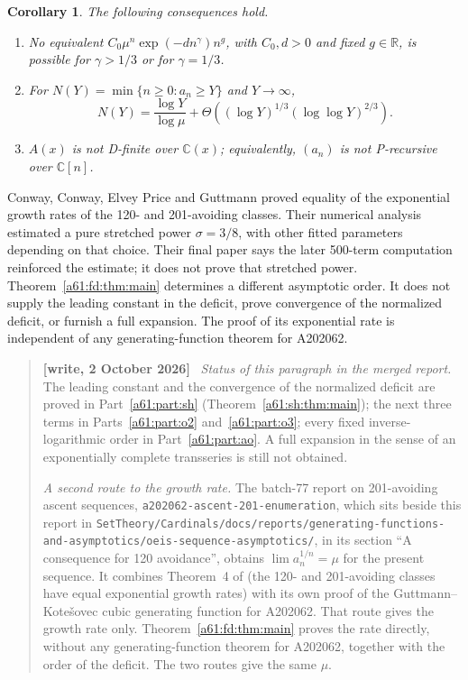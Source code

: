\documentclass[11pt,letterpaper]{article}
\numberwithin{equation}{section}
\newtheorem{corollary}[theorem]{Corollary}
\theoremstyle{remark}\newtheorem{remark}[theorem]{Remark}
\newcommand{\C}{\mathbb C}
\newenvironment{writenote}{\par\smallskip\begin{quote}\small\textbf{[write, 2 October 2026]}\ }{\end{quote}\smallskip}
\newcommand{\repopath}[1]{\nolinkurl{#1}}
\begin{document}
\begin{corollary}\label{a61:fd:cor:consequences}
The following consequences hold.
\begin{enumerate}
\item No equivalent $C_0\mu^n\exp(-d n^\gamma)n^g$, with $C_0,d>0$ and fixed $g\in\mathbb R$, is possible for $\gamma>1/3$ or for $\gamma=1/3$.
\item For $N(Y)=\min\{n\ge0:a_n\ge Y\}$ and $Y\to\infty$,
\[
 N(Y)=\frac{\log Y}{\log\mu}
 +\Theta\!\left((\log Y)^{1/3}(\log\log Y)^{2/3}\right).
\]
\item $A(x)$ is not D-finite over $\C(x)$; equivalently, $(a_n)$ is not P-recursive over $\C[n]$.
\end{enumerate}
\end{corollary}

Conway, Conway, Elvey Price and Guttmann \cite{Conway} proved equality of the exponential growth rates of the 120- and 201-avoiding classes. Their numerical analysis estimated a pure stretched power $\sigma=3/8$, with other fitted parameters depending on that choice. Their final paper says the later 500-term computation reinforced the estimate; it does not prove that stretched power. Theorem~\ref{a61:fd:thm:main} determines a different asymptotic order. It does not supply the leading constant in the deficit, prove convergence of the normalized deficit, or furnish a full expansion. The proof of its exponential rate is independent of any generating-function theorem for A202062.
\begin{writenote}
\emph{Status of this paragraph in the merged report.} The leading constant and the convergence of the normalized deficit are proved in Part~\ref{a61:part:sh} (Theorem~\ref{a61:sh:thm:main}); the next three terms in Parts~\ref{a61:part:o2} and~\ref{a61:part:o3}; every fixed inverse-logarithmic order in Part~\ref{a61:part:ao}. A full expansion in the sense of an exponentially complete transseries is still not obtained.

\emph{A second route to the growth rate.} The batch-77 report on 201-avoiding ascent sequences, \repopath{a202062-ascent-201-enumeration}, which sits beside this report in \repopath{SetTheory/Cardinals/docs/reports/generating-functions-and-asymptotics/oeis-sequence-asymptotics/}, in its section ``A consequence for 120 avoidance'', obtains $\lim a_n^{1/n}=\mu$ for the present sequence. It combines Theorem~4 of \cite{Conway} (the 120- and 201-avoiding classes have equal exponential growth rates) with its own proof of the Guttmann--Kote\v{s}ovec cubic generating function for A202062. That route gives the growth rate only. Theorem~\ref{a61:fd:thm:main} proves the rate directly, without any generating-function theorem for A202062, together with the order of the deficit. The two routes give the same $\mu$.
\end{writenote}
\end{document}
